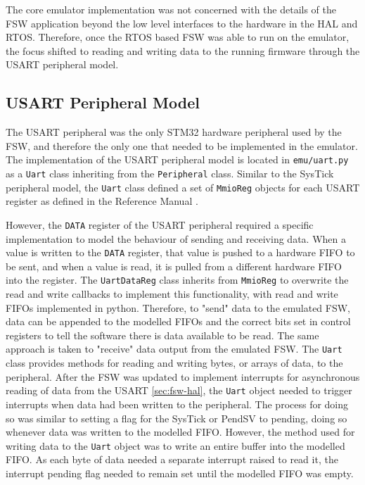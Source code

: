 \documentclass[../report.tex]{subfiles}
\begin{document}
The core emulator implementation was not concerned with the details of the FSW
application beyond the low level interfaces to the hardware in the HAL and
RTOS. Therefore, once the RTOS based FSW was able to run on the emulator, the
focus shifted to reading and writing data to the running firmware through the
USART peripheral model.

\subsection{USART Peripheral Model}

The USART peripheral was the only STM32 hardware peripheral used by the FSW,
and therefore the only one that needed to be implemented in the emulator. The
implementation of the USART peripheral model is located in
\lstinline{emu/uart.py} as a \lstinline|Uart| class inheriting from the
\lstinline|Peripheral| class. Similar to the SysTick peripheral model, the
\lstinline|Uart| class defined a set of \lstinline|MmioReg| objects for each
USART register as defined in the Reference Manual \citep{stm32f4_manual}.

However, the \lstinline|DATA| register of the USART peripheral required a
specific implementation to model the behaviour of sending and receiving data.
When a value is written to the \lstinline|DATA| register, that value is pushed
to a hardware FIFO to be sent, and when a value is read, it is pulled from a
different hardware FIFO into the register. The \lstinline|UartDataReg| class
inherits from \lstinline|MmioReg| to overwrite the read and write callbacks
to implement this functionality, with read and write FIFOs implemented in
python. Therefore, to "send" data to the emulated FSW, data can be appended to
the modelled FIFOs and the correct bits set in control registers to tell the
software there is data available to be read. The same approach is taken to
"receive" data output from the emulated FSW. The \lstinline|Uart| class provides
methods for reading and writing bytes, or arrays of data, to the peripheral.
After the FSW was updated to implement interrupts for asynchronous reading of
data from the USART \autoref{sec:fsw-hal}, the \lstinline|Uart| object needed
to trigger interrupts when data had been written to the peripheral. The process
for doing so was similar to setting a flag for the SysTick or PendSV to
pending, doing so whenever data was written to the modelled FIFO. However, the
method used for writing data to the \lstinline|Uart| object was to write an
entire buffer into the modelled FIFO. As each byte of data needed a separate
interrupt raised to read it, the interrupt pending flag needed to remain set
until the modelled FIFO was empty.
\end{document}
